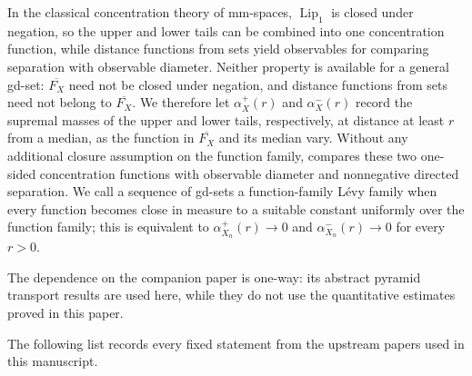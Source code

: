 \documentclass{amsart}
\theoremstyle{plain}
\theoremstyle{definition}
\theoremstyle{remark}
\begin{document}
In the classical concentration theory of mm-spaces,
$\operatorname{Lip}_1$ is closed under negation, so the upper and lower
tails can be combined into one concentration function, while distance
functions from sets yield observables for comparing separation with
observable diameter.  Neither property is available for a general gd-set:
$\overline{F_X}$ need not be closed under negation, and distance functions
from sets need not belong to $\overline{F_X}$.  We therefore let
$\alpha_X^+(r)$ and $\alpha_X^-(r)$ record the supremal masses of the upper
and lower tails, respectively, at distance at least $r$ from a median, as the
function in $\overline{F_X}$ and its median vary.  Without any additional
closure assumption on the function family,
 compares these two one-sided concentration
functions with observable diameter and nonnegative directed separation.  We
call a sequence of gd-sets a function-family L\'evy family when every
function becomes close in measure to a suitable constant uniformly over the
function family; this is equivalent to
$\alpha_{X_n}^+(r)\to0$ and $\alpha_{X_n}^-(r)\to0$ for every $r>0$.

The dependence on the companion paper \cite{gds3-ja} is one-way: its abstract
pyramid transport results are used here, while they do not use the
quantitative estimates proved in this paper.

The following list records every fixed statement from the upstream papers
\cite{gds1,gds2,gds3-ja} used in this manuscript.
\end{document}
